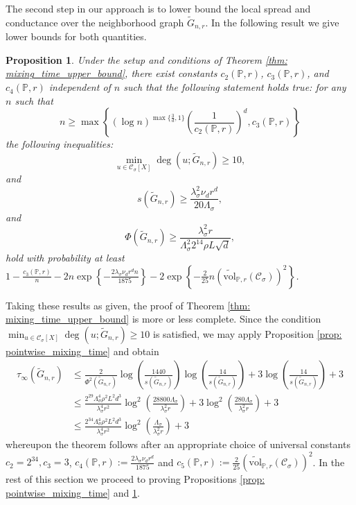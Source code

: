 \documentclass[11pt,twoside]{article}
\newtheorem{proposition}{Proposition}
\newcommand{\set}[1]{\left\{#1\right\}}
\newcommand{\vol}{\mathrm{vol}}
\newcommand{\1}{\mathbf{1}}
\newcommand{\Xbf}{X}             %
\newcommand{\Pbb}{\mathbb{P}}
\newcommand{\Cset}{\mathcal{C}}
\newcommand{\Csig}{\Cset_{\sigma}}
\begin{document}
The second step in our approach is to lower bound the local spread and conductance over the neighborhood graph $\widetilde{G}_{n,r}$. In the following result we give lower bounds for both quantities. 
\begin{proposition}
	\label{prop: local_spread_conductance}
	Under the setup and conditions of Theorem \ref{thm: mixing_time_upper_bound}, there exist constants $c_2(\Pbb,r)$, $c_3(\Pbb,r)$, and $c_4(\Pbb,r)$ independent of $n$ such that the following statement holds true: for any $n$ such that
	\begin{equation*}
	n \geq \max\left\{(\log n)^{\max\{\frac{3}{d},1\}}\left(\frac{1}{c_2(\Pbb,r)}\right)^d, c_3(\Pbb,r)\right\}
	\end{equation*}
	the following inequalities:
	\begin{equation}
	\label{eqn:min_degree}
	\min_{u \in \Csig[\Xbf]} \deg(u;\widetilde{G}_{n,r}) \geq 10,
	\end{equation}
	and
	\begin{equation}
	\label{eqn: local_spread}
	s(\widetilde{G}_{n,r}) \geq \frac{\lambda_{\sigma}^2 \nu_d r^d}{20\Lambda_{\sigma}},
	\end{equation}
	and
	\begin{equation}
	\label{eqn: conductance}
	\Phi(\widetilde{G}_{n,r}) \geq \frac{\lambda_{\sigma}^2 r}{\Lambda_{\sigma}^2 2^{14} \rho L \sqrt{d}},
	\end{equation}
	hold with probability at least $1 - \frac{c_3(\Pbb,r)}{n} - 2n\exp\set{-\frac{2\lambda_{\sigma} \nu_d r^d n}{1875}} - 2\exp\set{-\frac{2}{25}n(\widetilde{\vol}_{\Pbb,r}(\Csig))^2}$.
\end{proposition}

Taking these results as given, the proof of Theorem \ref{thm: mixing_time_upper_bound} is more or less complete. Since the condition $\min_{u \in \Csig[\Xbf]} \deg(u;\widetilde{G}_{n,r}) \geq 10$ is satisfied, we may apply Proposition \ref{prop: pointwise_mixing_time} and obtain
\begin{align*}
\tau_{\infty}(\widetilde{G}_{n,r}) & \leq  \frac{2}{\Phi^2(\widetilde{G}_{n,r})} \log \left(\frac{1440}{s(\widetilde{G}_{n,r})}\right)\log \left(\frac{14}{s(\widetilde{G}_{n,r})}\right)  + 3 \log \left(\frac{14}{s(\widetilde{G}_{n,r})}\right) + 3
\\
& \leq \frac{2^{29}\Lambda_{\sigma}^4\rho^2L^2 d^3}{\lambda_{\sigma}^4 r^2} \log^2\left(\frac{28800\Lambda_{\sigma}}{\lambda_{\sigma}^2 r}\right) + 3 \log^2\left(\frac{280\Lambda_{\sigma}}{\lambda_{\sigma}^2 r}\right) + 3 \\
& \leq \frac{2^{34}\Lambda_{\sigma}^4\rho^2L^2 d^3}{\lambda_{\sigma}^4 r^2} \log^2\left(\frac{\Lambda_{\sigma}}{\lambda_{\sigma}^2 r}\right) + 3
\end{align*}
whereupon the theorem follows after an appropriate choice of universal constants $c_2 = 2^{34}, c_3 = 3$, $c_4(\Pbb,r) := \frac{2\lambda_{\sigma} \nu_d r^d}{1875}$ and $c_5(\Pbb,r) := \frac{2}{25}(\widetilde{\vol}_{\Pbb,r}(\Csig))^2$. In the rest of this section we proceed to proving Propositions \ref{prop: pointwise_mixing_time} and \ref{prop: local_spread_conductance}.
\end{document}
